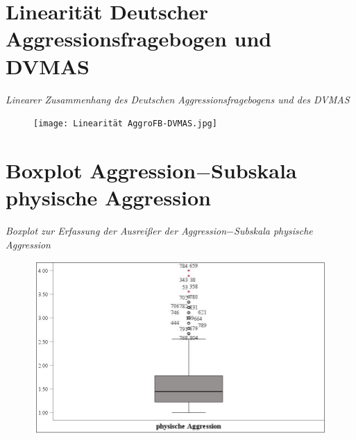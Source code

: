 \begin{appendices}
\begin{figure}[htb!]
    \end{figure}
    
    


\chapter{Linearität Deutscher Aggressionsfragebogen und DVMAS} \label{Linearitat_AggroFB_DVMAS}
\noindent \textit{Linearer Zusammenhang des Deutschen Aggressionsfragebogens und des DVMAS}

\begin{figure}[htb!]
    \centering
        \texttt{[image: Linearität AggroFB-DVMAS.jpg]}
        
\end{figure}
    
    


    \chapter{Boxplot Aggression$-$Subskala physische Aggression}            \label{Boxplot_phAggro}
    \noindent \textit{Boxplot zur Erfassung der Ausreißer der Aggression$-$Subskala physische Aggression}

    \begin{figure}[htb!]
        \centering
            \includegraphics[width=\textwidth]{Boxplot ph_aggro.jpg}


\end{figure}
\end{appendices}
